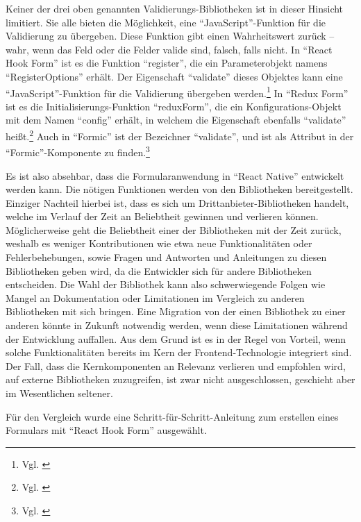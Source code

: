 Keiner der drei oben genannten Validierungs-Bibliotheken ist in dieser Hinsicht limitiert.
Sie alle bieten die Möglichkeit, eine \enquote{JavaScript}-Funktion für die Validierung zu übergeben.
Diese Funktion gibt einen Wahrheitswert zurück -- wahr, wenn das Feld oder die Felder valide sind, falsch, falls nicht.
In \enquote{React Hook Form} ist es die Funktion \enquote{register}, die ein Parameterobjekt namens \enquote{RegisterOptions} erhält.
Der Eigenschaft \enquote{validate} dieses Objektes kann eine \enquote{JavaScript}-Funktion für die Validierung übergeben werden.\footnote{Vgl. \cite{RegisterReactHookFormAPI}}
In \enquote{Redux Form} ist es die Initialisierungs-Funktion \enquote{reduxForm}, die ein Konfigurations-Objekt mit dem Namen \enquote{config} erhält, in welchem die Eigenschaft ebenfalls \enquote{validate} heißt.\footnote{Vgl. \cite{ReduxFormReduxFormAPI}}
Auch in \enquote{Formic} ist der Bezeichner \enquote{validate}, und ist als Attribut in der \enquote{Formic}-Komponente  zu finden.\footnote{Vgl. \cite{FormikComponentFormikDocsAPI}}


Es ist also absehbar, dass die Formularanwendung in \enquote{React Native} entwickelt werden kann.
Die nötigen Funktionen werden von den Bibliotheken bereitgestellt.
Einziger Nachteil hierbei ist, dass es sich um Drittanbieter-Bibliotheken handelt, welche im Verlauf der Zeit an Beliebtheit gewinnen und verlieren können.
Möglicherweise geht die Beliebtheit einer der Bibliotheken mit der Zeit zurück, weshalb es weniger Kontributionen wie etwa neue Funktionalitäten oder Fehlerbehebungen,
sowie Fragen und Antworten und Anleitungen zu diesen Bibliotheken geben wird, da die Entwickler sich für andere Bibliotheken entscheiden.
Die Wahl der Bibliothek kann also schwerwiegende Folgen wie Mangel an Dokumentation oder Limitationen im Vergleich zu anderen Bibliotheken mit sich bringen.
Eine Migration von der einen Bibliothek zu einer anderen könnte in Zukunft notwendig werden, wenn diese Limitationen während der Entwicklung auffallen.
Aus dem Grund ist es in der Regel von Vorteil, wenn solche Funktionalitäten bereits im Kern der Frontend-Technologie integriert sind.
Der Fall, dass die Kernkomponenten an Relevanz verlieren und empfohlen wird, auf externe Bibliotheken zuzugreifen, ist zwar nicht ausgeschlossen, geschieht aber im Wesentlichen seltener.

Für den Vergleich wurde eine Schritt-für-Schritt-Anleitung zum erstellen eines Formulars mit \enquote{React Hook Form} ausgewählt.  

